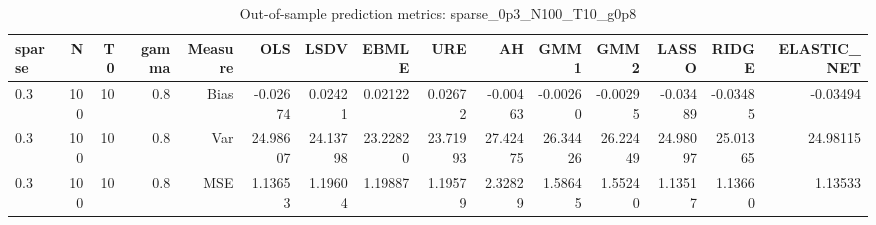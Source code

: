 \begin{table}[!htbp]\centering
\caption{Out-of-sample prediction metrics: sparse_0p3_N100_T10_g0p8}
\label{tab:table3_sparse_0p3_N100_T10_g0p8}
\begin{tabular}{lrrrrrrrrrrrrrr}
\hline
sparse & N & T0 & gamma & Measure & OLS & LSDV & EBMLE & URE & AH & GMM1 & GMM2 & LASSO & RIDGE & ELASTIC_NET \\
\hline
0.3 & 100 & 10 & 0.8 & Bias & -0.02674 & 0.02421 & 0.02122 & 0.02672 & -0.00463 & -0.00260 & -0.00295 & -0.03489 & -0.03485 & -0.03494 \\
0.3 & 100 & 10 & 0.8 & Var & 24.98607 & 24.13798 & 23.22820 & 23.71993 & 27.42475 & 26.34426 & 26.22449 & 24.98097 & 25.01365 & 24.98115 \\
0.3 & 100 & 10 & 0.8 & MSE & 1.13653 & 1.19604 & 1.19887 & 1.19579 & 2.32829 & 1.58645 & 1.55240 & 1.13517 & 1.13660 & 1.13533 \\
\hline
\end{tabular}
\end{table}

